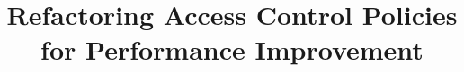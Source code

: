 \documentclass{acm_proc_article-sp}
\begin{document}
\title{Refactoring Access Control Policies for Performance Improvement}

\pagestyle{plain} %
\setcounter{page}{1}
%
%
%
%
%

%

\end{document}
